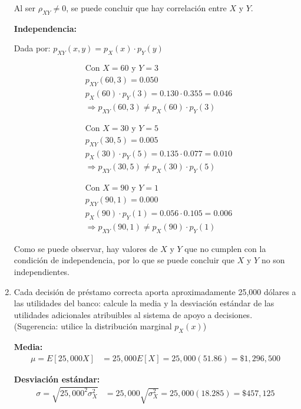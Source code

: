 \documentclass[12pt]{report}
\newcommand{\linejump}{\hfill \break}
\begin{document}
\begin{enumerate}
    Al ser $\rho_{XY} \neq 0$, se puede concluir que {\color{blue}hay correlación} entre $X$ y $Y$.

    \linejump
    \textbf{Independencia:}

    Dada por: $p_{XY}(x, y) = p_X(x) \cdot p_Y(y)$
    
    \begin{align*}
      &\text{Con } X = 60 \text{ y } Y = 3 \\
      &p_{XY}(60, 3) = 0.050 \\
      &p_X(60) \cdot p_Y(3) = 0.130 \cdot 0.355 = 0.046 \\
      &\Rightarrow p_{XY}(60, 3) \neq p_X(60) \cdot p_Y(3)
    \end{align*}

    \begin{align*}
      &\text{Con } X = 30 \text{ y } Y = 5 \\
      &p_{XY}(30, 5) = 0.005 \\
      &p_X(30) \cdot p_Y(5) = 0.135 \cdot 0.077 = 0.010 \\
      &\Rightarrow p_{XY}(30, 5) \neq p_X(30) \cdot p_Y(5)
    \end{align*}

    \begin{align*}
      &\text{Con } X = 90 \text{ y } Y = 1 \\
      &p_{XY}(90, 1) = 0.000 \\
      &p_X(90) \cdot p_Y(1) = 0.056 \cdot 0.105 = 0.006 \\
      &\Rightarrow p_{XY}(90, 1) \neq p_X(90) \cdot p_Y(1)
    \end{align*}

    Como se puede observar, hay valores de $X$ y $Y$ que no cumplen con la condición de independencia, por lo que se puede concluir que $X$ y $Y$ {\color{blue}no son independientes.} \\

    \item Cada decisión de préstamo correcta aporta aproximadamente 25,000 dólares a las utilidades del banco: calcule la media y la desviación estándar de las utilidades adicionales atribuibles al sistema de apoyo a decisiones. (Sugerencia: utilice la distribución marginal $p_X(x)$)
    
    \textbf{Media:}
    \begin{align*}
      \mu = E[25,000X] &= 25,000E[X] = 25,000(51.86) = \$1,296,500
    \end{align*}

    \linejump
    \textbf{Desviación estándar:}
    \begin{align*}
      \sigma = \sqrt{25,000^2 \sigma_X^2} &= 25,000\sqrt{\sigma_X^2} = 25,000(18.285) = \$457,125
    \end{align*}
  \end{enumerate}
\end{document}
